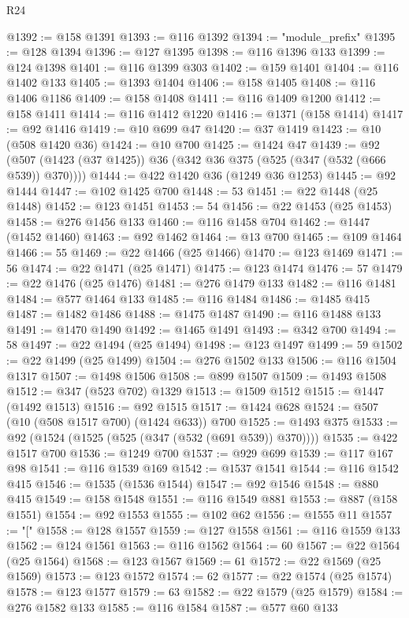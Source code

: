 \begin{lexlean}{R24}
\begin{coremodule}
@1392 := @158 @1391
@1393 := @116 @1392
@1394 := "module_prefix"
@1395 := @128 @1394
@1396 := @127 @1395
@1398 := @116 @1396 @133
@1399 := @124 @1398
@1401 := @116 @1399 @303
@1402 := @159 @1401
@1404 := @116 @1402 @133
@1405 := @1393 @1404
@1406 := @158 @1405
@1408 := @116 @1406 @1186
@1409 := @158 @1408
@1411 := @116 @1409 @1200
@1412 := @158 @1411
@1414 := @116 @1412 @1220
@1416 := @1371 (@158 @1414)
@1417 := @92 @1416
@1419 := @10 @699 @47
@1420 := @37 @1419
@1423 := @10 (@508 @1420 @36)
@1424 := @10 @700
@1425 := @1424 @47
@1439 := @92 (@507 (@1423 (@37 @1425)) @36 (@342 @36 @375 (@525 (@347 (@532 (@666 @539)) @370))))
@1444 := @422 @1420 @36 (@1249 @36 @1253)
@1445 := @92 @1444
@1447 := @102 @1425 @700
@1448 := 53
@1451 := @22 @1448 (@25 @1448)
@1452 := @123 @1451
@1453 := 54
@1456 := @22 @1453 (@25 @1453)
@1458 := @276 @1456 @133
@1460 := @116 @1458 @704
@1462 := @1447 (@1452 @1460)
@1463 := @92 @1462
@1464 := @13 @700
@1465 := @109 @1464
@1466 := 55
@1469 := @22 @1466 (@25 @1466)
@1470 := @123 @1469
@1471 := 56
@1474 := @22 @1471 (@25 @1471)
@1475 := @123 @1474
@1476 := 57
@1479 := @22 @1476 (@25 @1476)
@1481 := @276 @1479 @133
@1482 := @116 @1481
@1484 := @577 @1464 @133
@1485 := @116 @1484
@1486 := @1485 @415
@1487 := @1482 @1486
@1488 := @1475 @1487
@1490 := @116 @1488 @133
@1491 := @1470 @1490
@1492 := @1465 @1491
@1493 := @342 @700
@1494 := 58
@1497 := @22 @1494 (@25 @1494)
@1498 := @123 @1497
@1499 := 59
@1502 := @22 @1499 (@25 @1499)
@1504 := @276 @1502 @133
@1506 := @116 @1504 @1317
@1507 := @1498 @1506
@1508 := @899 @1507
@1509 := @1493 @1508
@1512 := @347 (@523 @702) @1329
@1513 := @1509 @1512
@1515 := @1447 (@1492 @1513)
@1516 := @92 @1515
@1517 := @1424 @628
@1524 := @507 (@10 (@508 @1517 @700) (@1424 @633)) @700
@1525 := @1493 @375
@1533 := @92 (@1524 (@1525 (@525 (@347 (@532 (@691 @539)) @370))))
@1535 := @422 @1517 @700
@1536 := @1249 @700
@1537 := @929 @699
@1539 := @117 @167 @98
@1541 := @116 @1539 @169
@1542 := @1537 @1541
@1544 := @116 @1542 @415
@1546 := @1535 (@1536 @1544)
@1547 := @92 @1546
@1548 := @880 @415
@1549 := @158 @1548
@1551 := @116 @1549 @881
@1553 := @887 (@158 @1551)
@1554 := @92 @1553
@1555 := @102 @62
@1556 := @1555 @11
@1557 := "["
@1558 := @128 @1557
@1559 := @127 @1558
@1561 := @116 @1559 @133
@1562 := @124 @1561
@1563 := @116 @1562
@1564 := 60
@1567 := @22 @1564 (@25 @1564)
@1568 := @123 @1567
@1569 := 61
@1572 := @22 @1569 (@25 @1569)
@1573 := @123 @1572
@1574 := 62
@1577 := @22 @1574 (@25 @1574)
@1578 := @123 @1577
@1579 := 63
@1582 := @22 @1579 (@25 @1579)
@1584 := @276 @1582 @133
@1585 := @116 @1584
@1587 := @577 @60 @133

\end{coremodule}
\end{lexlean}
